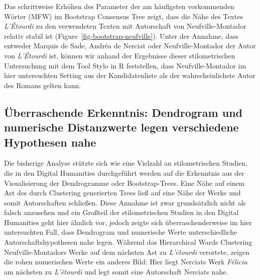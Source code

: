 \documentclass[
  12pt,
  letterpaper,
  DIV=11,
  numbers=noendperiod]{scrreprt}
\begin{document}
Das schrittweise Erhöhen des Parameter der am häufigsten vorkommenden
Wörter (MFW) im Bootstrap Consensus Tree zeigt, dass die Nähe des Textes
\emph{L'Étourdi} zu den verwendeten Texten mit Autorschaft von
Neufville-Montador relativ stabil ist
(Figure~\ref{fig-bootstrap-neufville}). Unter der Annahme, dass entweder
Marquis de Sade, Andréa de Nerciat oder Neufville-Montador der Autor von
\emph{L'Étourdi} ist, können wir anhand der Ergebnisse dieser
stilometrischen Untersuchung mit dem Tool Stylo in R feststellen, dass
Neufville-Montador im hier untersuchten Setting aus der Kandidatenliste
als der wahrscheinlichste Autor des Romans gelten kann.

\subsection{Überraschende Erkenntnis: Dendrogram und numerische
Distanzwerte legen verschiedene Hypothesen
nahe}\label{uxfcberraschende-erkenntnis-dendrogram-und-numerische-distanzwerte-legen-verschiedene-hypothesen-nahe}

Die bisherige Analyse stützte sich wie eine Vielzahl an stilometrischen
Studien, die in den Digital Humanities durchgeführt werden auf die
Erkenntnis aus der Visualisierung der Dendrogramme oder Bootstrap-Trees.
Eine Nähe auf einem Ast des durch Clustering generierten Trees ließ auf
eine Nähe der Werke und somit Autorschaften schließen. Diese Annahme ist
zwar grundsätzlich nicht als falsch anzusehen und ein Großteil der
stilometrischen Studien in den Digital Humanities geht hier ähnlich vor,
jedoch zeigte sich überraschenderweise im hier untersuchten Fall, dass
Dendrogram und numerische Werte unterschiedliche Autorschaftshypothesen
nahe legen. Während das Hierarchical Wards Clustering
Neufville-Montadors Werke auf dem nächsten Ast zu \emph{L'étourdi}
verortete, zeigen die rohen numerischen Werte ein anderes Bild: Hier
liegt Nerciats Werk \emph{Félicia} am nächsten zu \emph{L'étourdi} und
legt somit eine Autorschaft Nerciats nahe.
\end{document}
